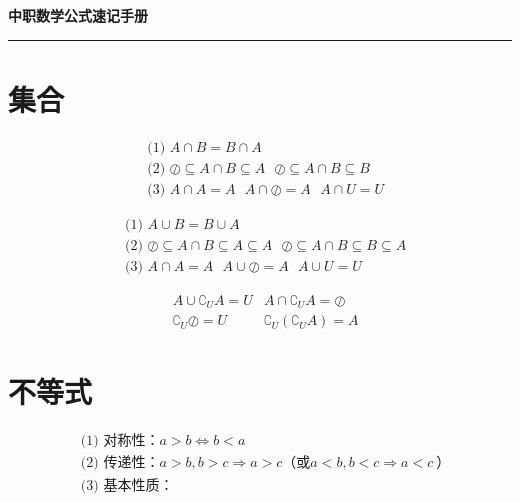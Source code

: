 \documentclass[a5paper]{article}
\title{}
\author{}
\date{}
\begin{document}

\begin{center}
    \textbf{\LARGE 中职数学公式速记手册}
    \vspace{5pt}
\end{center}
\hrule height 1pt

\section{{\large \textbf{集合}}}

\begin{align*}
    & \text{(1)~} A \cap B = B \cap A \\
    & \text{(2)~} \oslash \subseteq A \cap B \subseteq A ~~~ \oslash \subseteq A \cap B \subseteq B \\
    & \text{(3)~} A \cap A = A ~~~ A \cap \oslash = A ~~~ A \cap U = U
\end{align*}

\begin{align*}
    & \text{(1)~} A \cup B = B \cup A \\
    & \text{(2)~} \oslash \subseteq A \cap B \subseteq A \subseteq A ~~~ \oslash \subseteq A \cap B \subseteq B \subseteq A \\
    & \text{(3)~} A \cap A = A ~~~ A \cup \oslash = A ~~~ A \cup U = U
\end{align*}

\begin{align*}
    & A \cup \complement_{U}A = U & A \cap \complement_{U}A = \oslash \\
    & \complement_{U}\oslash = U & \complement_{U}(\complement_{U}A) = A
\end{align*}

\newpage
\section{{\large \textbf{不等式}}}


\begin{align*}
    & \text{(1) 对称性：} a > b \Leftrightarrow b < a \\
    & \text{(2) 传递性：} a>b,b>c \Rightarrow a>c \text{（或} a<b,b<c \Rightarrow a<c~\text{）} \\
    & \text{(3) 基本性质：} 
\end{align*}
\end{document}

